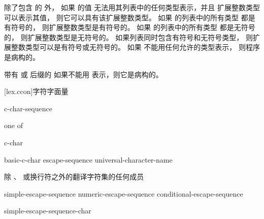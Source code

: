 \pnum
除了包含
 的  外，
如果  的值
无法用其列表中的任何类型表示，并且
扩展整数类型 可以表示其值，
则它可以具有该扩展整数类型。
如果  的列表中的所有类型
都是有符号的，
则扩展整数类型是有符号的。
如果  的列表中的所有类型
都是无符号的，
则扩展整数类型是无符号的。
如果列表同时包含有符号和无符号类型，
则扩展整数类型可以是有符号或无符号的。
如果 
不能用任何允许的类型表示，
则程序是病构的。
\begin{note}
带有  或  后缀的 
如果不能用  表示，则它是病构的。
\end{note}

[lex.ccon]{字符字面量}

%
\begin{bnf}
\br
      c-char-sequence 
\end{bnf}

\begin{bnf}
 \textnormal{one of}\br
    \quad{}\quad{}\quad{}
\end{bnf}

\begin{bnf}
\br
    c-char 
\end{bnf}

\begin{bnf}
\br
    basic-c-char\br
    escape-sequence\br
    universal-character-name
\end{bnf}

\begin{bnf}
\br
    \textnormal{除 、}\br
    \bnfindent\textnormal{ 或换行符之外的翻译字符集的任何成员}
\end{bnf}

\begin{bnf}
\br
    simple-escape-sequence\br
    numeric-escape-sequence\br
    conditional-escape-sequence
\end{bnf}

\begin{bnf}
\br
    \terminal{\textbackslash} simple-escape-sequence-char
\end{bnf}

